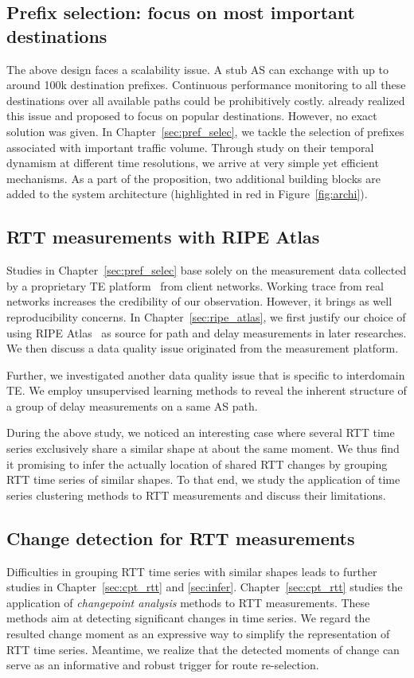 \subsection{Prefix selection: focus on most important destinations}
The above design faces a scalability issue.
A stub AS can exchange with up to around 100k destination prefixes.
Continuous performance monitoring to all these destinations over all available paths could be prohibitively costly.
\citet{Feamster2003} already realized this issue and proposed to focus on popular destinations.
However, no exact solution was given.
In Chapter~\ref{sec:pref_selec}, we tackle the selection of prefixes associated with important traffic volume.
Through study on their temporal dynamism at different time resolutions, we arrive at very simple yet efficient mechanisms. 
As a part of the proposition, two additional building blocks are added to the system architecture (highlighted in red in Figure~\ref{fig:archi}).

\subsection{RTT measurements with RIPE Atlas}
Studies in Chapter~\ref{sec:pref_selec} base solely on the measurement data collected by a proprietary TE platform~\cite{b6} from client networks. 
Working trace from real networks increases the credibility of our observation. 
However, it brings as well reproducibility concerns.
In Chapter~\ref{sec:ripe_atlas}, we first justify our choice of using RIPE Atlas~\cite{atlas} as source for path and delay measurements in later researches.
We then discuss a data quality issue originated from the measurement platform.

Further, we investigated another data quality issue that is specific to interdomain TE. 
We employ unsupervised learning methods to reveal the inherent structure of a group of delay measurements on a same AS path.

During the above study, we noticed an interesting case where several RTT time series exclusively share a similar shape at about the same moment.
We thus find it promising to infer the actually location of shared RTT changes by grouping RTT time series of similar shapes. 
To that end, we study the application of time series clustering methods to RTT measurements and discuss their limitations.

\subsection{Change detection for RTT measurements}
Difficulties in grouping RTT time series with similar shapes leads to further studies in Chapter~\ref{sec:cpt_rtt} and \ref{sec:infer}. 
Chapter~\ref{sec:cpt_rtt} studies the application of \textit{changepoint analysis} methods to RTT measurements. 
These methods aim at detecting significant changes in time series.
We regard the resulted change moment as an expressive way to simplify the representation of RTT time series. 
Meantime, we realize that the detected moments of change can serve as an informative and robust trigger for route re-selection.

